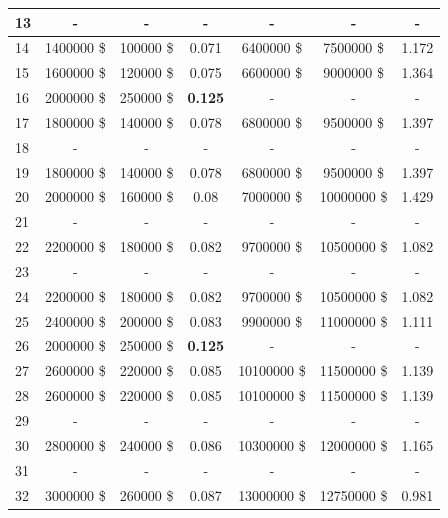 \documentclass[letterpaper]{article}
\begin{document}
\begin{table}[htbp!]
\begin{tabular}{|l|c|c|c||c|c|c|}
	  \cellcolor[HTML]{FFFFF0} 13 & - & - & - & - & - & - \\ \hline
	  \cellcolor[HTML]{FF69B4} 14 & 1400000 \$ & 100000 \$ & 0.071 & 6400000 \$ & 7500000 \$ & 1.172 \\ \hline
	  \cellcolor[HTML]{FF69B4} 15 & 1600000 \$ & 120000 \$ & 0.075 & 6600000 \$ & 9000000 \$ & 1.364 \\ \hline
	  \cellcolor[HTML]{E6E6FA} 16 & 2000000 \$ & 250000 \$ & \textbf{0.125} & - & - & - \\ \hline
	  \cellcolor[HTML]{FF8C00} 17 & 1800000 \$ & 140000 \$ & 0.078 & 6800000 \$ & 9500000 \$ & 1.397 \\ \hline
	  \cellcolor[HTML]{EEEED1} 18  & - & - & - & - & - & - \\ \hline
	  \cellcolor[HTML]{FF8C00} 19 & 1800000 \$ & 140000 \$ & 0.078 & 6800000 \$ & 9500000 \$ & 1.397 \\ \hline
	  \cellcolor[HTML]{FF8C00} 20 & 2000000 \$ & 160000 \$ & 0.08 & 7000000 \$ & 10000000 \$ & 1.429 \\ \hline
	  \cellcolor[HTML]{FFFFFF} 21  & - & - & - & - & - & - \\ \hline
	  \cellcolor[HTML]{FF4500} 22 & 2200000 \$ & 180000 \$ & 0.082 & 9700000 \$ & 10500000 \$ & 1.082 \\ \hline
	  \cellcolor[HTML]{FFC1C1} 23  & - & - & - & - & - & - \\ \hline
	  \cellcolor[HTML]{FF4500} 24 & 2200000 \$ & 180000 \$ & 0.082 & 9700000 \$ & 10500000 \$ & 1.082 \\ \hline
	  \cellcolor[HTML]{FF4500} 25 & 2400000 \$ & 200000 \$ & 0.083 & 9900000 \$ & 11000000 \$ & 1.111 \\ \hline
	  \cellcolor[HTML]{E6E6FA} 26 & 2000000 \$ & 250000 \$ & \textbf{0.125} & - & - & - \\ \hline
	  \cellcolor[HTML]{FFD700} 27 & 2600000 \$ & 220000 \$ & 0.085 & 10100000 \$ & 11500000 \$ & 1.139 \\ \hline
	  \cellcolor[HTML]{FFD700} 28 & 2600000 \$ & 220000 \$ & 0.085 & 10100000 \$ & 11500000 \$ & 1.139 \\ \hline
	  \cellcolor[HTML]{FFFFF0} 29 & - & - & - & - & - & - \\ \hline
	  \cellcolor[HTML]{FFD700} 30 & 2800000 \$ & 240000 \$ & 0.086 & 10300000 \$ & 12000000 \$ & 1.165 \\ \hline
	  \cellcolor[HTML]{BEBEBE} 31  & - & - & - & - & - & - \\ \hline
	  \cellcolor[HTML]{2E8B57} 32 & 3000000 \$ & 260000 \$ & 0.087 & 13000000 \$ & 12750000 \$ & 0.981 \\ \hline

\end{tabular}
\end{table}
\end{document}

